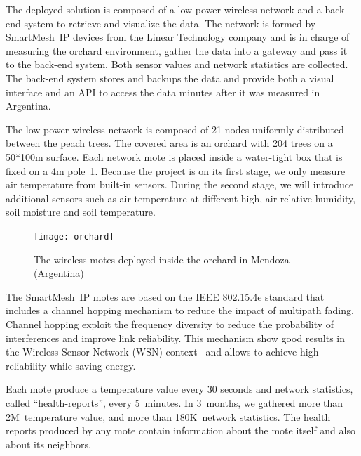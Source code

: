 \documentclass{sig-alternate}
\newcommand{\smip}                  {SmartMesh~IP\xspace}
\begin{document}

The deployed solution is composed of a low-power wireless network and a back-end system to retrieve and visualize the data.
The network is formed by \smip devices from the Linear Technology company and is in charge of measuring the orchard environment, gather the data into a gateway and pass it to the back-end system.
Both sensor values and network statistics are collected.
The back-end system stores and backups the data and provide both a visual interface and an API to access the data minutes after it was measured in Argentina.


The low-power wireless network is composed of 21 nodes uniformly distributed between the peach trees.
The covered area is an orchard with 204 trees on a 50*100m surface.
Each network mote is placed inside a water-tight box that is fixed on a 4m pole~\ref{fig:orchard}.
Because the project is on its first stage, we only measure air temperature from built-in sensors.
During the second stage, we will introduce additional sensors such as air temperature at different high, air relative humidity, soil moisture and soil temperature.

\begin{figure}
    \centering
    \texttt{[image: orchard]}
    \caption{The wireless motes deployed inside the orchard in Mendoza (Argentina)}
    \label{fig:orchard}
\end{figure}


The \smip motes are based on the IEEE 802.15.4e standard that includes a channel hopping mechanism to reduce the impact of multipath fading.
Channel hopping exploit the frequency diversity to reduce the probability of interferences and improve link reliability.
This mechanism show good results in the Wireless Sensor Network (WSN) context~\cite{watteyne2010mitigating, watteyne2009reliability} and allows to achieve high reliability while saving energy.


Each mote produce a temperature value every 30 seconds and network statistics, called ``health-reports'', every 5~minutes.
In 3~months, we gathered more than 2M~temperature value, and more than 180K~network statistics.
The health reports produced by any mote contain information about the mote itself and also about its neighbors.
\end{document}

